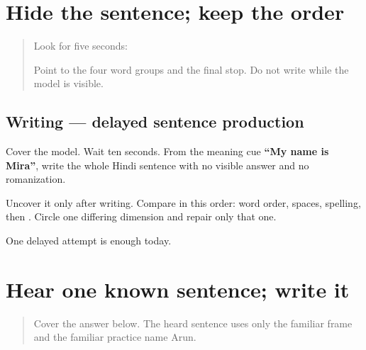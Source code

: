 \section[\texorpdfstring{\hi{मेरा} \hi{नाम} \hi{मीरा} \hi{है।} (merā nām Mīrā hai)}{मेरा नाम मीरा है। (merā nām Mīrā hai)}]{Hide the sentence; keep the order}

\label{lesson:HI-W06-name-sentence-delayed}



\begin{quote}
Look for five seconds:

\begin{quote}
\textbf{   }
\end{quote}

Point to the four word groups and the final stop. Do not write while the model is visible.
\end{quote}

\subsection*{Writing — delayed sentence production}
Cover the model. Wait ten seconds. From the meaning cue \textbf{\textquotedblleft{}My name is Mira\textquotedblright{}}, write the whole Hindi sentence with no visible answer and no romanization.

Uncover it only after writing. Compare in this order: word order, spaces, spelling, then \textbf{}. Circle one differing dimension and repair only that one.

\begin{tcolorbox}[breakable,colback=teal!4,colframe=teal!35!black,title={Before you move on}]
One delayed attempt is enough today.
\end{tcolorbox}
\section[\texorpdfstring{\hi{मेरा} \hi{नाम} \hi{अरुण} \hi{है।} (merā nām Aruṇ hai)}{मेरा नाम अरुण है। (merā nām Aruṇ hai)}]{Hear one known sentence; write it}

\label{lesson:HI-W06-name-sentence-dictation}



\begin{quote}
Cover the answer below. The heard sentence uses only the familiar frame and the familiar practice name Arun.
\end{quote}

